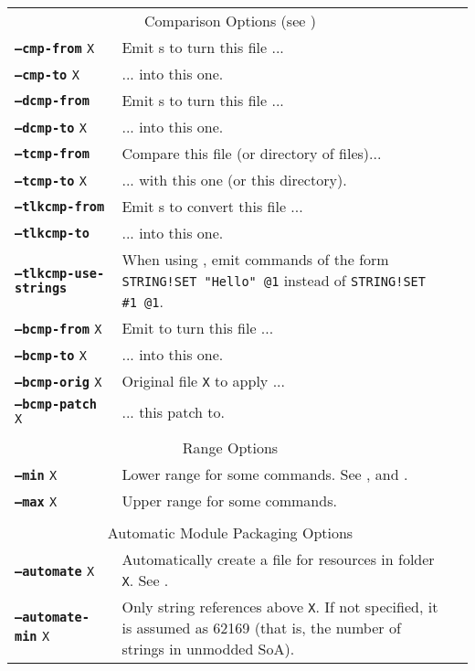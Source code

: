 \documentclass{article}
\def\ttref#1{\ahrefloc{#1}{\tt #1}}
\def\DEFINE#1{{\tt \bf #1}\label{#1}\index{#1}}
\def\t#1{{\tt #1}}
\begin{document}
\begin{tabular}{lp{10in}|p{10in}}
\\
\multicolumn{2}{c}{ {\color{red} Comparison Options} (see \ttref{--out})} \\
\DEFINE{--cmp-from} \t{X}&	Emit \ttref{WRITE!BYTE}s to turn this file ... \\
\DEFINE{--cmp-to}   \t{X}&	... into this one. \\
\DEFINE{--dcmp-from}\t{X}&	Emit \ttref{REPLACE}s to turn this \ttref{DLG} file ... \\
\DEFINE{--dcmp-to}  \t{X}&	... into this one. \\
\DEFINE{--tcmp-from}\t{X}&	Compare this \ttref{TRA} file (or directory of \ttref{TRA }files)... \\
\DEFINE{--tcmp-to}  \t{X}&	... with this one (or this directory). \\
\DEFINE{--tlkcmp-from}\t{X}&	Emit \ttref{STRING!SET}s to convert this \ttref{TLK} file ... \\
\DEFINE{--tlkcmp-to}\t{X}&	... into this one. \\
\DEFINE{--tlkcmp-use-strings} & When using \ttref{--tlkcmp-from}, emit
commands of the form \t{STRING!SET "Hello" @1} instead of \t{STRING!SET \#1
@1}. \\
\DEFINE{--bcmp-from}  \t{X}&      Emit \ttref{APPLY!BCS!PATCH} to turn this
\ttref{BCS} file ... \\
\DEFINE{--bcmp-to}    \t{X}&      ... into this one. \\
\DEFINE{--bcmp-orig}  \t{X}&      Original file \t{X} to apply ... \\
\DEFINE{--bcmp-patch} \t{X}&      ... this patch to. \\
\\
\multicolumn{2}{c}{ \color{red} Range Options} \\
\DEFINE{--min} \t{X} & Lower range for some commands. See
\ttref{--traify-tlk}, \ttref{--tlkcmp-from} and \ttref{--string}.  \\
\DEFINE{--max} \t{X} & Upper range for some commands. \\
\\
\multicolumn{2}{c}{ \color{red} Automatic Module Packaging Options} \\
\DEFINE{--automate} \t{X}&   Automatically create a \ttref{TP2} file for resources in folder \t{X}. See \ttref{--out}. \\
\DEFINE{--automate-min} \t{X}& Only \ttref{--automate} string references above \t{X}. If not specified, it is assumed as 62169 (that is, the number of strings in unmodded SoA). \\

\end{tabular}
\end{document}
